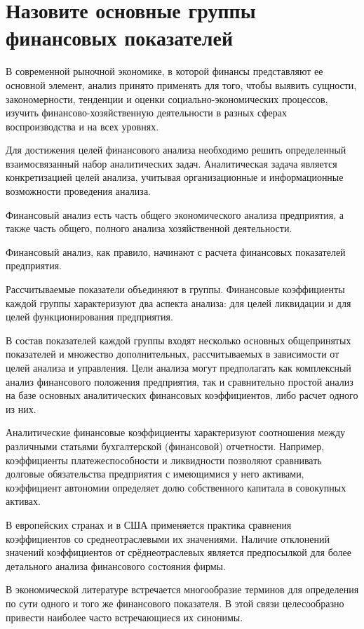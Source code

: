 \section{Назовите основные группы финансовых показателей}

В современной рыночной экономике, в которой финансы представляют ее основной элемент, анализ принято применять для того, чтобы выявить сущности, закономерности, тенденции и оценки социально-экономических процессов, изучить финансово-хозяйственную деятельности в разных сферах воспроизводства и на всех уровнях.

Для достижения целей финансового анализа необходимо решить определенный взаимосвязанный набор аналитических задач. Аналитическая задача является конкретизацией целей анализа, учитывая организационные и информационные возможности проведения анализа.

Финансовый анализ есть часть общего экономического анализа предприятия, а также часть общего, полного анализа хозяйственной деятельности.

Финансовый анализ, как правило, начинают с расчета финансовых показателей предприятия.

Рассчитываемые показатели объединяют в группы. Финансовые коэффициенты каждой группы характеризуют два аспекта анализа: для целей ликвидации и для целей функционирования предприятия.

В состав показателей каждой группы входят несколько основных общепринятых показателей и множество дополнительных, рассчитываемых в зависимости от целей анализа и управления. Цели анализа могут предполагать как комплексный анализ финансового положения предприятия, так и сравнительно простой анализ на базе основных аналитических финансовых коэффициентов, либо расчет одного из них.

Аналитические финансовые коэффициенты характеризуют соотношения между различными статьями бухгалтерской (финансовой) отчетности. Например, коэффициенты платежеспособности и ликвидности позволяют сравнивать долговые обязательства предприятия с имеющимися у него активами, коэффициент автономии определяет долю собственного капитала в совокупных активах.

В европейских странах и в США применяется практика сравнения коэффициентов со среднеотраслевыми их значениями. Наличие отклонений значений коэффициентов от срёднеотраслевых является предпосылкой для более детального анализа финансового состояния фирмы.

В экономической литературе встречается многообразие терминов для определения по сути одного и того же финансового показателя. В этой связи целесообразно привести наиболее часто встречающиеся их синонимы.

